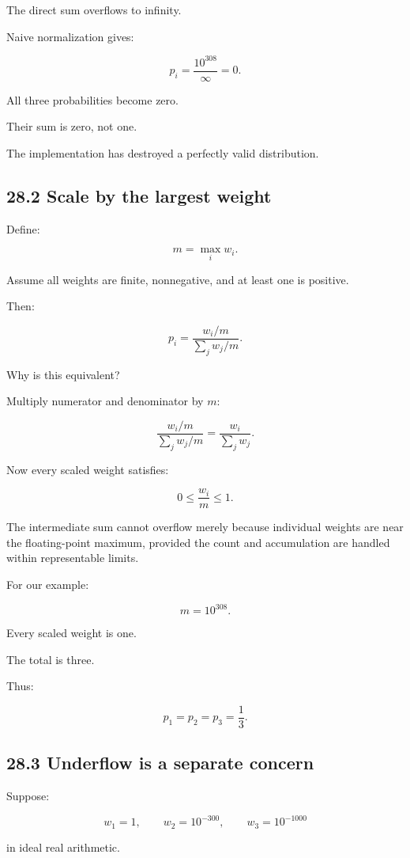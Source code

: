 The direct sum overflows to infinity.

Naive normalization gives:

\[ p_i=\frac{10^{308}}{\infty}=0. \]

All three probabilities become zero.

Their sum is zero, not one.

The implementation has destroyed a perfectly valid distribution.

\subsection{28.2 Scale by the largest weight}\label{02-foundations-ii-ch031-scale-by-the-largest-weight}

Define:

\[ \boxed{ m=\max_iw_i }. \]

Assume all weights are finite, nonnegative, and at least one is positive.

Then:

\[ p_i= \frac{w_i/m}{\sum_jw_j/m}. \]

Why is this equivalent?

Multiply numerator and denominator by \(m\):

\[ \frac{w_i/m}{\sum_jw_j/m} = \frac{w_i}{\sum_jw_j}. \]

Now every scaled weight satisfies:

\[ 0\le\frac{w_i}{m}\le1. \]

The intermediate sum cannot overflow merely because individual weights are near the floating-point maximum, provided the count and accumulation are handled within representable limits.

For our example:

\[ m=10^{308}. \]

Every scaled weight is one.

The total is three.

Thus:

\[ \boxed{ p_1=p_2=p_3=\frac13 }. \]

\subsection{28.3 Underflow is a separate concern}\label{02-foundations-ii-ch031-underflow-is-a-separate-concern}

Suppose:

\[ w_1=1, \qquad w_2=10^{-300}, \qquad w_3=10^{-1000} \]

in ideal real arithmetic.

